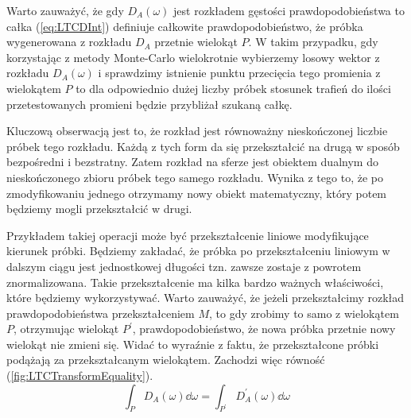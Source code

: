\documentclass[../main.tex]{subfiles}
\begin{document}
%    

Warto zauważyć, że gdy $D_A(\omega)$ jest rozkładem gęstości prawdopodobieństwa to całka (\ref{eq:LTCDInt}) definiuje całkowite prawdopodobieństwo, że próbka wygenerowana z rozkładu $D_A$ przetnie wielokąt $P$. W takim przypadku, gdy korzystając z metody Monte-Carlo wielokrotnie wybierzemy losowy wektor z rozkładu $D_A(\omega)$ i sprawdzimy istnienie punktu przecięcia tego promienia z wielokątem $P$ to dla odpowiednio dużej liczby próbek stosunek trafień do ilości przetestowanych promieni będzie przybliżał szukaną całkę.

Kluczową obserwacją jest to, że rozkład jest równoważny nieskończonej liczbie próbek tego rozkładu. Każdą z tych form da się przekształcić na drugą w sposób bezpośredni i bezstratny. Zatem rozkład na sferze jest obiektem dualnym do nieskończonego zbioru próbek tego samego rozkładu. Wynika z tego to, że po zmodyfikowaniu jednego otrzymamy nowy obiekt matematyczny, który potem będziemy mogli przekształcić w drugi.

Przykładem takiej operacji może być przekształcenie liniowe modyfikujące kierunek próbki. Będziemy zakładać, że próbka po przekształceniu liniowym w dalszym ciągu jest jednostkowej długości tzn. zawsze zostaje z powrotem znormalizowana. Takie przekształcenie ma kilka bardzo ważnych właściwości, które będziemy wykorzystywać. Warto zauważyć, że jeżeli przekształcimy rozkład prawdopodobieństwa przekształceniem $M$, to gdy zrobimy to samo z wielokątem $P$, otrzymując wielokąt $P^\prime$, prawdopodobieństwo, że nowa próbka przetnie nowy wielokąt nie zmieni się. Widać to wyraźnie z faktu, że przekształcone próbki podążają za przekształcanym wielokątem. Zachodzi więc równość (\ref{fig:LTCTransformEquality}).
\begin{equation}
\int_P {
  D_A(\omega)
  \dd \omega
} = \int_{P^\prime} {
  D^\prime_A(\omega)
  \dd \omega
}
\label{fig:LTCTransformEquality}
\end{equation}
\end{document}

